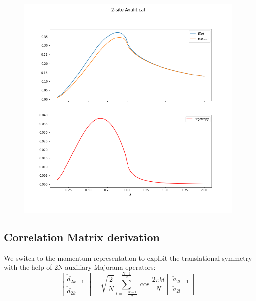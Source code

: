 \documentclass[10pt,a4paper]{article}
\begin{document}
\begin{figure}[h]
	\centering
	\includegraphics[width=\linewidth]{2siteanalerg}
	\caption{}
	\label{fig:2siteanalerg}
\end{figure}

	
	
	
	
	
	
	
	
	
	
	
	
	
	
	
	
	
	
	
	
	
	
	
	
	
	
	
	
	
	
	
	
	
	
	
	
	
	
	
	\subsection{Correlation Matrix derivation}\label{appendixcalculation}
	We switch to the momentum representation to exploit the translational symmetry with the help of 2N auxiliary Majorana operators:
	\begin{equation}\label{eq:ddefinition}\left[\begin{array}{c}
	\check{d}_{2 k-1} \\
	\check{d}_{2 k}
	\end{array}\right]=\sqrt{\frac{2}{N}} \sum_{l=-\frac{N-1}{2}}^{\frac{N-1}{2}} \cos \frac{2 \pi k l}{N}\left[\begin{array}{c}
	\check{a}_{2 l-1} \\
	\check{a}_{2 l}
	\end{array}\right]\end{equation}
	
\end{document}
